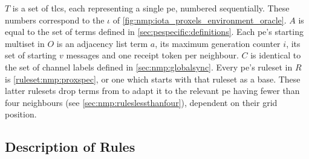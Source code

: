 
\(T\) is a set of \glspl{tlc}, each representing a single \gls{pe}, numbered sequentially.  These numbers correspond to the \(\iota\) of \cref{fig:nmp:iota_proxels_environment_oracle}.  \(A\) is equal to the set of terms defined in \cref{sec:pespecific:definitions}.  Each \gls{pe}’s starting multiset in \(O\) is an adjacency list term \(a\), its maximum generation counter \(i\), its set of starting \(v\) messages and one receipt token per neighbour.  \(C\) is identical to the set of channel labels defined in \cref{sec:nmp:globalsync}.  Every \gls{pe}'s \gls{ruleset} in \(R\) is \cref{ruleset:nmp:proxspec}, or one which starts with that \gls{ruleset} as a base.  These latter \glspl{ruleset} drop terms from  to adapt it to the relevant \gls{pe} having fewer than four neighbours (see \cref{sec:nmp:ruleslessthanfour}), dependent on their grid position.

\subsection{Description of Rules}

